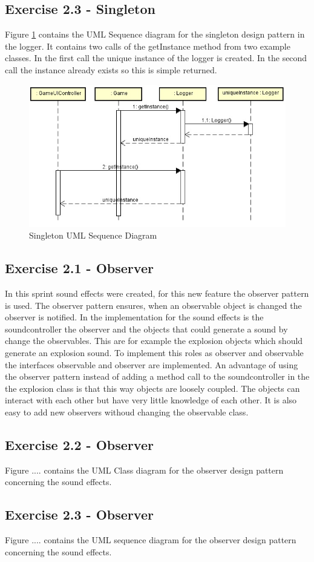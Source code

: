 \subsection{Exercise 2.3 - Singleton}
Figure \ref{fig:2-3singleton} contains the UML Sequence diagram for the singleton design pattern in the logger. It contains two calls of the getInstance method from two example classes. In the first call the unique instance of the logger is created. In the second call the instance already exists so this is simple returned. 

\begin{figure}[ht!]
\centering
\includegraphics[width=13cm]{loggerSequence.jpg}
\caption{Singleton UML Sequence Diagram}
\label{fig:2-3singleton}
\end{figure}

\subsection{Exercise 2.1 - Observer}
In this sprint sound effects were created, for this new feature the observer pattern is used. The observer pattern ensures, when an observable object is changed the observer is notified. In the implementation for the sound effects is the soundcontroller the observer and the objects that could generate a sound by change the observables. This are for example the explosion objects which should generate an explosion sound. To implement this roles as observer and observable the interfaces observable and observer are implemented. An advantage of using the observer pattern instead of adding a method call to the soundcontroller in the  the explosion class is that this way objects are loosely coupled. The objects can interact with each other but have very little knowledge of each other. It is also easy to add new observers withoud changing the observable class. 

\newpage

\subsection{Exercise 2.2 - Observer}
Figure ....  contains the UML Class diagram for the observer design pattern concerning the sound effects.

\subsection{Exercise 2.3 - Observer}
Figure .... contains the UML sequence diagram for the observer design pattern concerning the sound effects.